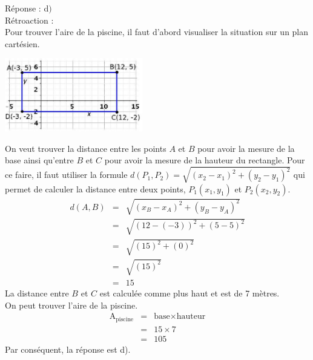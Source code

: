 \documentclass[letterpaper, 12pt]{article}
\begin{document}
R\'eponse : d$)$\\

R\'etroaction :\\
Pour trouver l'aire de la piscine, il faut d'abord visualiser la situation sur un plan cart\'esien. \\
\begin{center}
 \includegraphics[width=6cm,bb=14 14 415 225]{Q2442.eps}
\end{center}
On veut trouver la distance entre les points $A$ et $B$ pour avoir la mesure de la base ainsi qu'entre $B$ et $C$ pour avoir la mesure de la hauteur du rectangle. Pour ce faire, il faut utiliser la formule $d(P_{1}, P_{2})=\sqrt{(x_{2}-x_{1})^{2}+(y_{2}-y_{1})^{2}}$ qui permet de calculer la distance entre deux points, $P_{1}(x_{1},y_{1})$ et $P_{2}(x_{2},y_{2})$.
\begin{eqnarray*}
 d(A, B)&=&\sqrt{(x_{B}-x_{A})^{2}+(y_{B}-y_{A})^{2}}\\
&=&\sqrt{(12-(-3))^{2}+(5-5)^{2}}\\
&=&\sqrt{(15)^{2}+(0)^{2}}\\
&=&\sqrt{(15)^{2}}\\
&=&15
\end{eqnarray*}
La distance entre $B$ et $C$ est calcul\'ee comme plus haut et est de 7 m\`etres.\\
On peut trouver l'aire de la piscine.
\begin{eqnarray*}
 \textrm{A}_{\textrm{piscine}}&=&\textrm{base}\times \textrm{hauteur}\\
&=&15\times 7 \\
&=&105
\end{eqnarray*}
Par cons\'equent, la r\'eponse est d).\\
\end{document}
